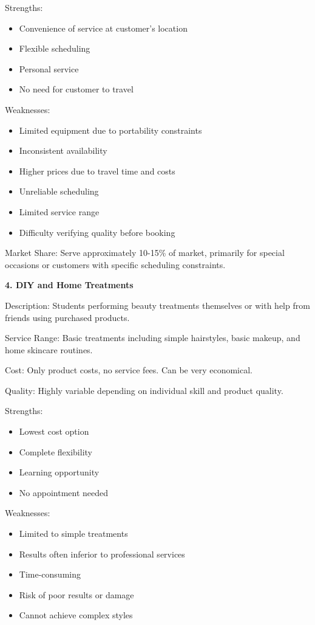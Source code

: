 \documentclass[a4paper,12pt]{article}
\begin{document}
Strengths:
\begin{itemize}[leftmargin=2em]
    \item Convenience of service at customer's location
    \item Flexible scheduling
    \item Personal service
    \item No need for customer to travel
\end{itemize}

Weaknesses:
\begin{itemize}[leftmargin=2em]
    \item Limited equipment due to portability constraints
    \item Inconsistent availability
    \item Higher prices due to travel time and costs
    \item Unreliable scheduling
    \item Limited service range
    \item Difficulty verifying quality before booking
\end{itemize}

Market Share: Serve approximately 10-15\% of market, primarily for special occasions or customers with specific scheduling constraints.

\textbf{4. DIY and Home Treatments}

Description: Students performing beauty treatments themselves or with help from friends using purchased products.

Service Range: Basic treatments including simple hairstyles, basic makeup, and home skincare routines.

Cost: Only product costs, no service fees. Can be very economical.

Quality: Highly variable depending on individual skill and product quality.

Strengths:
\begin{itemize}[leftmargin=2em]
    \item Lowest cost option
    \item Complete flexibility
    \item Learning opportunity
    \item No appointment needed
\end{itemize}

Weaknesses:
\begin{itemize}[leftmargin=2em]
    \item Limited to simple treatments
    \item Results often inferior to professional services
    \item Time-consuming
    \item Risk of poor results or damage
    \item Cannot achieve complex styles
\end{itemize}
\end{document}
